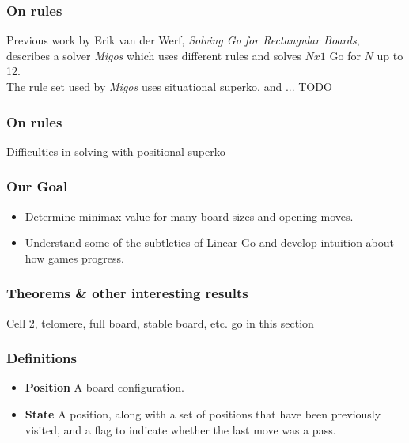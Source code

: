 \documentclass{beamer}
\begin{document}
    \begin{frame}
        \frametitle{On rules}
        Previous work by Erik van der Werf, \textit{Solving Go for Rectangular Boards},
        describes a solver \textit{Migos} which uses different rules
        and solves $Nx1$ Go for $N$ up to 12.\\\medskip
        The rule set used by \textit{Migos} uses situational superko, and ... TODO
    \end{frame}

    \begin{frame}
        \frametitle{On rules}
        Difficulties in solving with positional superko
    \end{frame}

    \begin{frame}
        \frametitle{Our Goal}
        \begin{itemize}[<+->]
            \item Determine minimax value for many board sizes and opening moves.
            \item Understand some of the subtleties of Linear Go and develop intuition about how games progress.
        \end{itemize}
    \end{frame}

    \begin{frame}
        \frametitle{Theorems \& other interesting results}
        Cell 2, telomere, full board, stable board, etc. go in this section
    \end{frame}

    \begin{frame}
        \frametitle{Definitions}
        \begin{itemize}[<+->]
            \item \textbf{Position} A board configuration.
            \item \textbf{State} A position, along with a set of positions that have been previously visited, and a flag to indicate whether the last move was a pass.
        \end{itemize}
    \end{frame}
\end{document}
